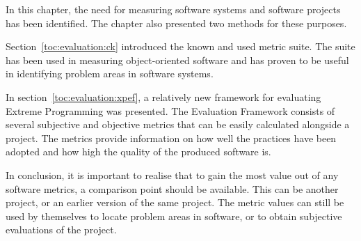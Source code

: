 In this chapter, the need for measuring software systems and software 
projects has been identified. The chapter also presented two methods 
for these purposes. 

Section~\ref{toc:evaluation:ck} introduced the known and used 
 metric suite. The suite has been used in measuring 
object-oriented software and has proven to be useful in identifying 
problem areas in software systems.

In section~\ref{toc:evaluation:xpef}, a relatively new framework for 
evaluating Extreme Programming was presented. The  
Evaluation Framework consists of several subjective and objective 
metrics that can be easily calculated alongside a project. The 
metrics provide information on how well the  practices have 
been adopted and how high the quality of the produced software is.

In conclusion, it is important to realise that to gain the most value 
out of any software metrics, a comparison point should be available. 
This can be another project, or an earlier version of the same 
project. The metric values can still be used by themselves to locate 
problem areas in software, or to obtain subjective evaluations of the
project.

